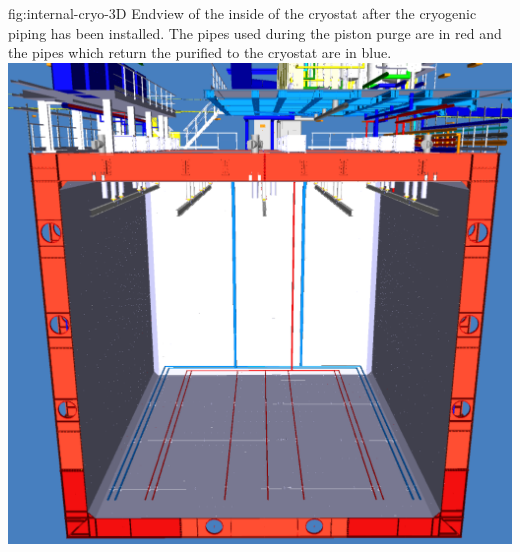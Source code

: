 \begin{dunefigure}{fig:internal-cryo-3D}
  {Endview of the inside of the cryostat after the cryogenic piping has been installed. The  pipes used during the piston purge are in red and the pipes which return the purified  to the cryostat are in blue.}
\includegraphics[width=.98\textwidth]{graphics/Internal-Piping-3D.pdf}
\end{dunefigure}


